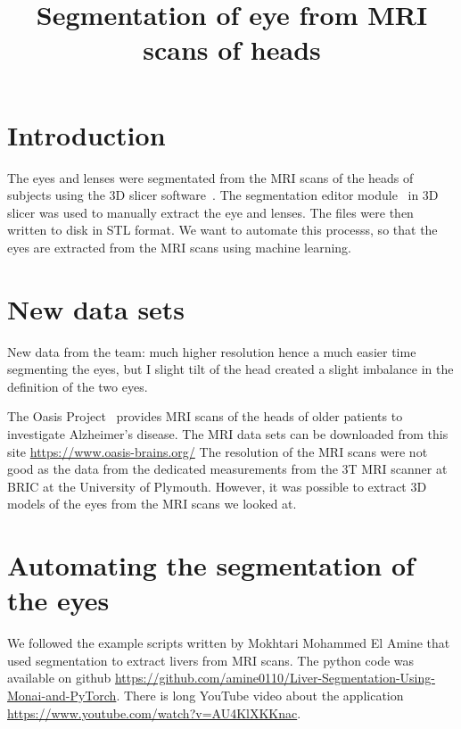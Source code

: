 \documentclass[12pt]{article}
\begin{document}
\title{Segmentation of eye from MRI scans of heads}
\date{}

\maketitle


\section{Introduction}

The eyes and lenses were segmentated from the MRI scans of the heads
of subjects using the 3D slicer software~\cite{kikinis20133d}.  The
segmentation editor module~\cite{pinter2019polymorph} in 3D slicer was
used to manually extract the eye and lenses.  The files were then
written to disk in STL format.  We want to automate this processs, so
that the eyes are extracted from the MRI scans using machine learning.


\section{New data sets}

New data from the team: much higher resolution hence a much easier
time segmenting the eyes, but I slight tilt of the head created a
slight imbalance in the definition of the two eyes.


The Oasis Project~\cite{van2021mri} provides MRI scans of the heads of
older patients to investigate Alzheimer's disease.  The MRI data sets
can be downloaded from this site \url{https://www.oasis-brains.org/}
The resolution of the MRI scans were not good as the data from the
dedicated measurements from the 3T MRI scanner at BRIC at the
University of Plymouth. However, it was possible to extract 3D models of the
eyes from the MRI scans we looked at.

\section{Automating the segmentation of the eyes}

We followed the example scripts written by
Mokhtari Mohammed El Amine that used segmentation to extract
livers from MRI scans. The python code was available
on github
\url{https://github.com/amine0110/Liver-Segmentation-Using-Monai-and-PyTorch}. There
is long YouTube video about the application
\url{https://www.youtube.com/watch?v=AU4KlXKKnac}.
\end{document}
